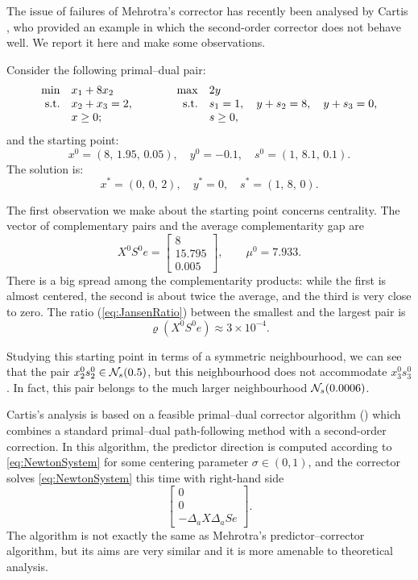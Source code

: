 The issue of failures of Mehrotra's corrector
has recently been analysed by Cartis \cite{Cartis04}, 
who provided an example in which the second-order corrector does 
not behave well. 
We report it here and make some observations.

\begin{example}  \label{ex:Coralia}
Consider the following primal--dual pair:
\[
  \begin{array}{rlp{2em}rl}
    \min        & x_1 + 8 x_2    & & \max  & 2 y \\
    \mbox{s.t.} & x_2 + x_3 = 2, & & \mbox{s.t.} & s_1 = 1,\quad
                                                   y + s_2 = 8,\quad
						   y + s_3 = 0, \\
                & x \geq 0;      & &             & s \geq 0,
  \end{array}
\]
and the starting point:
\[
  x^0 = (8,\, 1.95,\, 0.05), \quad y^0 = -0.1, \quad s^0 = (1,\, 8.1,\, 0.1).
\]
The solution is:
\[
  x^* = (0,\, 0,\, 2), \quad y^* = 0, \quad s^* = (1,\, 8,\, 0).
\]
\end{example}

The first observation we make about the starting point 
concerns centrality. The vector of complementary pairs and
the average complementarity gap are
\[
  X^0S^0e = \left[ \begin{array}{c}
            8 \\ 15.795 \\ 0.005
            \end{array} \right],
  \qquad
  \mu^0 = 7.933.
\]
There is a big spread among the
complementarity products: while the first is almost centered, the second
is about twice the average, and the third is very close to zero. 
The ratio (\ref{eq:JansenRatio}) between the smallest and the largest pair is
\[
  \varrho(X^0S^0e) \approx 3 \times 10^{-4}.
\]

Studying this starting point in terms of a symmetric neighbourhood,
we can see that the pair $x^0_2s^0_2 \in \mathcal{N}_s(0.5)$, but 
this neighbourhood does not accommodate $x^0_3s^0_3$.
In fact, this pair belongs to the much larger neighbourhood $\mathcal{N}_s(0.0006)$.

Cartis's analysis is based on a feasible primal--dual
corrector algorithm (\PDC)
which combines a standard primal--dual path-following method with 
a second-order correction.
In this algorithm, the predictor direction is computed according
to \eqref{eq:NewtonSystem} for some centering parameter $\sigma \in (0, 1)$,
and the corrector solves \eqref{eq:NewtonSystem} this time with
right-hand side
\[
  \left[ \begin{array}{c}
    0 \\ 0 \\ -\Delta_a X\Delta_a Se
  \end{array} \right].
\]
The \PDC algorithm is not exactly the same as Mehrotra's 
predictor--corrector algorithm, but its aims are very similar and
it is more amenable to theoretical analysis.

